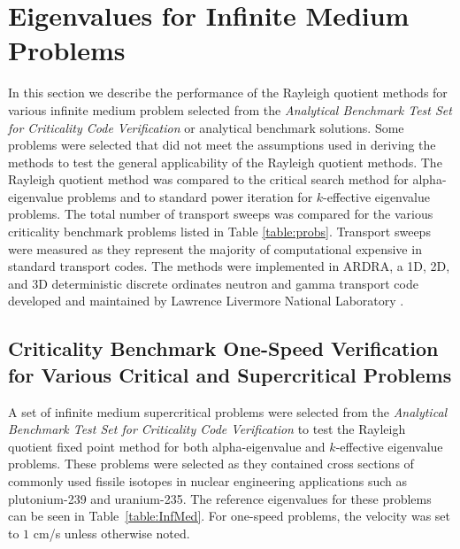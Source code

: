 \chapter{Eigenvalues for Infinite Medium Problems}%

In this section we describe the performance of the Rayleigh quotient methods for various infinite medium problem selected from the \textit{Analytical Benchmark Test Set for Criticality Code Verification} \cite{sood2003analytical} or analytical benchmark solutions. Some problems were selected that did not meet the assumptions used in deriving the methods to test the general applicability of the Rayleigh quotient methods. The Rayleigh quotient method was compared to the critical search method \cite{hill_efficient_1983} for alpha-eigenvalue problems and to standard power iteration for $k$-effective eigenvalue problems. The total number of transport sweeps was compared for the various criticality benchmark problems listed in Table \ref{table:probs}. Transport sweeps were measured as they represent the majority of computational expensive in standard transport codes. The methods were implemented in ARDRA, a 1D, 2D, and 3D deterministic discrete ordinates neutron and gamma transport code developed and maintained by Lawrence Livermore National Laboratory \cite{hanebutte_ardra_1999}.





\section{Criticality Benchmark One-Speed Verification for Various Critical and Supercritical Problems}

A set of infinite medium supercritical problems were selected from the \textit{Analytical Benchmark Test Set for Criticality Code Verification} \cite{sood2003analytical} to test the Rayleigh quotient fixed point method for both alpha-eigenvalue and $k$-effective eigenvalue problems. These problems were selected as they contained cross sections of commonly used fissile isotopes in nuclear engineering applications such as plutonium-239 and uranium-235. The reference eigenvalues for these problems can be seen in Table~\ref{table:InfMed}. For one-speed problems, the velocity was set to $1$ cm/s unless otherwise noted.

